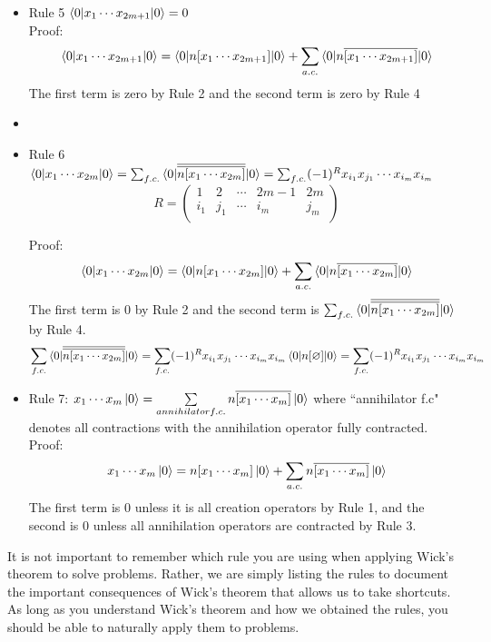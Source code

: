 \documentclass{article}
\newcommand{\ol}{\overline}
\newcommand{\cd}{\ensuremath{\cdots} }
\begin{document}
\begin{itemize}
\item Rule 5 $\braket{0 | x_1 \cd x_{2m + 1} | 0} = 0 $ \\

Proof: 
\[\braket{0 | x_1 \cd x_{2m + 1} | 0}   =  \braket{0 | n[x_1 \cd x_{2m + 1}] | 0}  +  \sum_{a.c.} \braket{0 | n\ol{[x_1 \cd x_{2m + 1}]} | 0}  \]
The first term is zero by Rule 2 and the second term is zero by Rule 4

\item \item Rule 6 $\braket{0 | x_1 \cd x_{2m } | 0} = \sum_{f.c.} \braket{0 | \ol{\ol{ n[x_1 \cd x_{2m }]}}|0} = \sum_{f.c.} (-1)^R x_{i_1} x_{j_1} \cd x_{i_m} x_{i_m}$\\

\begin{equation*}
R = 
\begin{pmatrix}
1 & 2 &\cd  & 2m - 1 & 2m  \\
i_1 & j_1 & \cd  & i_m & j_m \\
\end{pmatrix}
\end{equation*}

Proof: 
\[\braket{0 | x_1 \cd x_{2m} | 0}   =  \braket{0 | n[x_1 \cd x_{2m}] | 0}  +  \sum_{a.c.} \braket{0 | n\ol{[x_1 \cd x_{2m}]} | 0}  \]
The first term is 0 by Rule 2 and the second term is $ \sum_{f.c.} \braket{0 | \ol{\ol{ n[x_1 \cd x_{2m }]}}|0}$ by Rule 4. 
\[ \sum_{f.c.} \braket{0 | \ol{\ol{ n[x_1 \cd x_{2m }]}}|0} =  \sum_{f.c.} (-1)^R x_{i_1} x_{j_1} \cd x_{i_m} x_{i_m} \braket{0 | n[\varnothing] | 0} = \sum_{f.c.} (-1)^R x_{i_1} x_{j_1} \cd x_{i_m} x_{i_m}  \]

\item Rule 7: $x_1 \cd x_m \ket{0} = \sum\limits_{annihilator f.c.} n\ol{[x_1 \cd x_m] }\ket{0} $
where ``annihilator f.c" denotes all contractions with the annihilation operator fully contracted.\\

Proof: 
\[x_1 \cd x_m \ket{0} = n[x_1 \cd x_m] \ket{0} + \sum_{a.c.} n\ol{[x_1 \cd x_m ]} \ket{0} \]
The first term is 0 unless it is all creation operators by Rule 1, and the second is 0 unless all annihilation operators are contracted by Rule 3. 
\end{itemize}
It is not important to remember which rule you are using when applying Wick's theorem to solve problems. 
Rather, we are simply listing the rules to document the important consequences of Wick's theorem that allows us to take shortcuts.
As long as you understand Wick's theorem and how we obtained the rules, you should be able to naturally apply them to problems. 
\end{document}
